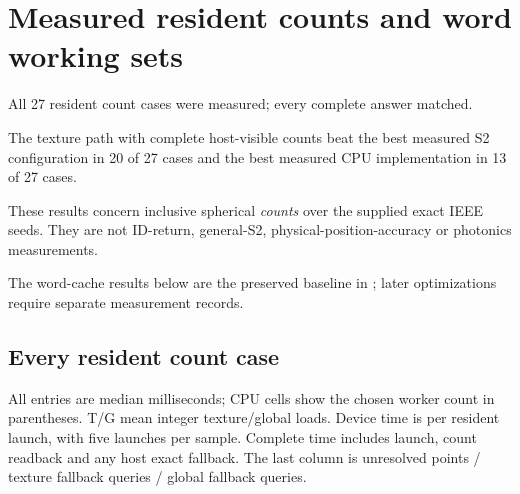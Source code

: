 
\section{Measured resident counts and word working sets}

\label{sec:resident-results}

All 27 resident count cases were measured; every complete answer matched.

The texture path with complete host-visible counts beat the best measured S2 configuration in 20 of 27 cases and the best measured CPU implementation in 13 of 27 cases.

These results concern inclusive spherical \emph{counts} over the supplied exact IEEE seeds. They are not ID-return, general-S2, physical-position-accuracy or photonics measurements.

The word-cache results below are the preserved baseline in ; later optimizations require separate measurement records.

\subsection{Every resident count case}

All entries are median milliseconds; CPU cells show the chosen worker count in parentheses. T/G mean integer texture/global loads. Device time is per resident launch, with five launches per sample. Complete time includes launch, count readback and any host exact fallback. The last column is unresolved points / texture fallback queries / global fallback queries.

